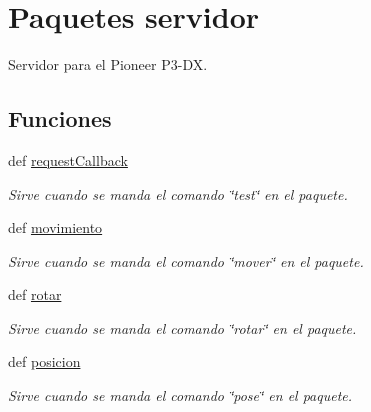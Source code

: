 \hypertarget{namespaceservidor}{
\section{Paquetes servidor}
\label{namespaceservidor}
}


Servidor para el Pioneer P3-\/DX.  


\subsection*{Funciones}
\begin{DoxyCompactItemize}
\item 
def \hyperlink{namespaceservidor_a06ea535cfe56429259d8de76298416cb}{requestCallback}
\begin{DoxyCompactList}\small\item\em Sirve cuando se manda el comando \char`\"{}test\char`\"{} en el paquete. \end{DoxyCompactList}\item 
def \hyperlink{namespaceservidor_aef5180c02cf1d163167be16732d7250e}{movimiento}
\begin{DoxyCompactList}\small\item\em Sirve cuando se manda el comando \char`\"{}mover\char`\"{} en el paquete. \end{DoxyCompactList}\item 
def \hyperlink{namespaceservidor_a66205c06d52988bbeb961068e554edfc}{rotar}
\begin{DoxyCompactList}\small\item\em Sirve cuando se manda el comando \char`\"{}rotar\char`\"{} en el paquete. \end{DoxyCompactList}\item 
def \hyperlink{namespaceservidor_a4f30fc83b9ff1f43b6dde147ed4c31fc}{posicion}
\begin{DoxyCompactList}\small\item\em Sirve cuando se manda el comando \char`\"{}pose\char`\"{} en el paquete. \end{DoxyCompactList}\end{DoxyCompactItemize}
